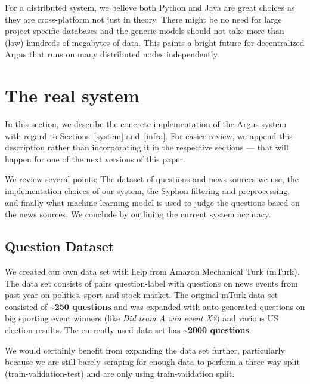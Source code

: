 \documentclass[11pt,a4paper]{article}
\begin{document}
For a distributed system, we believe both Python and Java are great
choices as they are cross-platform not just in theory.  There might
be no need for large project-specific databases and the generic models
should not take more than (low) hundreds of megabytes of data.  This
paints a bright future for decentralized Argus that runs on many
distributed nodes independently.

\newcommand{\gray}[1]{\textcolor{gray}{#1}}
\newcommand{\olive}[1]{\textcolor{olive}{\textbf{#1}}}
\newcommand{\brown}[1]{\textcolor{brown}{\textit{#1}}}
\newcommand{\other}[1]{\textcolor{orange}{\textit{#1}}}



\section{The real system}
\label{real}

In this section, we describe the concrete implementation of the Argus system
with regard to Sections~\ref{system} and~\ref{infra}.  For easier review,
we append this description rather than incorporating it in the respective
sections --- that will happen for one of the next versions of this paper.

We review several points: The dataset of questions and news sources we use,
the implementation choices of our system, the Syphon filtering and
preprocessing, and finally what machine learning model is used to judge
the questions based on the news sources.  We conclude by outlining the current
system accuracy.

\subsection{Question Dataset}

We created our own data set with help from Amazon Mechanical Turk (mTurk). The data set consists of pairs question-label with questions on news events from past year on politics, sport and stock market. The original mTurk data set consisted of \textbf{\textasciitilde 250 questions} and was expanded with auto-generated questions on big sporting event winners (like \textit{Did team A win event X?}) and various US election results. The currently used data set has \textbf{\textasciitilde 2000 questions}.

We would certainly benefit from expanding the data set further, particularly because we are still barely scraping for enough data to perform a three-way split (train-validation-test) and are only using train-validation split.
\end{document}
